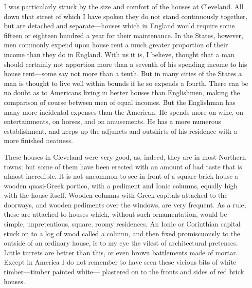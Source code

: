 I was particularly struck by the size and comfort of the houses at
Cleveland.  All down that street of which I have spoken they do not
stand continuously together, but are detached and separate---houses
which in England would require some fifteen or eighteen hundred a
year for their maintenance.  In the States, however, men commonly
expend upon house rent a much greater proportion of their income
than they do in England.  With us it is, I believe, thought that a
man should certainly not apportion more than a seventh of his
spending income to his house rent---some say not more than a tenth.
But in many cities of the States a man is thought to live well
within bounds if he so expends a fourth.  There can be no doubt as
to Americans living in better houses than Englishmen, making the
comparison of course between men of equal incomes.  But the
Englishman has many more incidental expenses than the American.  He
spends more on wine, on entertainments, on horses, and on
amusements.  He has a more numerous establishment, and keeps up the
adjuncts and outskirts of his residence with a more finished
neatness.

These houses in Cleveland were very good, as, indeed, they are in
most Northern towns; but some of them have been erected with an
amount of bad taste that is almost incredible.  It is not uncommon
to see in front of a square brick house a wooden quasi-Greek
portico, with a pediment and Ionic columns, equally high with the
house itself.  Wooden columns with Greek capitals attached to the
doorways, and wooden pediments over the windows, are very frequent.
As a rule, these are attached to houses which, without such
ornamentation, would be simple, unpretentious, square, roomy
residences.  An Ionic or Corinthian capital stuck on to a log of
wood called a column, and then fixed promiscuously to the outside
of an ordinary house, is to my eye the vilest of architectural
pretenses.  Little turrets are better than this, or even brown
battlements made of mortar.  Except in America I do not remember to
have seen these vicious bits of white timber---timber painted white---%
plastered on to the fronts and sides of red brick houses.

